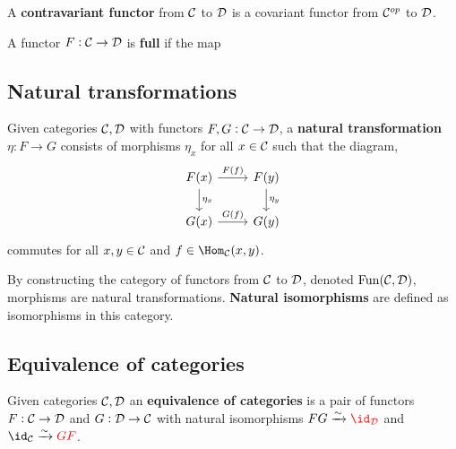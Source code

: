 \documentclass[../Year2.tex]{subfiles}
\begin{document}
\begin{definition}
    A \textbf{contravariant functor} from $\mathcal{C}$ to $\mathcal{D}$ is a covariant functor from $\mathcal{C}^{op}$ to $\mathcal{D}$.
\end{definition}

\begin{definition}[Full]
    A functor $F:\mathcal{C}\rightarrow\mathcal{D}$ is \textbf{full} if the map 
\end{definition}

\subsection{Natural transformations}

\begin{definition}
    Given categories $\mathcal{C},\mathcal{D}$ with functors $F,G:\mathcal{C}\rightarrow\mathcal{D}$, a \textbf{natural transformation} $\eta:F\rightarrow G$ consists of morphisms $\eta_x$ for all $x\in\mathcal{C}$ such that the diagram, \[
        \begin{tikzcd}
            F(x)\arrow[r, "F(f)"] \arrow[d, "\eta_x"] & F(y) \arrow[d, "\eta_y"]\\
            G(x)\arrow[r, "G(f)"]  & G(y)
        \end{tikzcd}
    \] commutes for all $x,y\in \mathcal{C}$ and $f\in\Hom_\CCC(x,y)$.
\end{definition}

\begin{remark}
    By constructing the category of functors from $\mathcal{C}$ to $\mathcal{D}$, denoted $\text{Fun}(\mathcal{C},\mathcal{D})$, morphisms are natural transformations. \textbf{Natural isomorphisms} are defined as isomorphisms in this category.
\end{remark}

\subsection{Equivalence of categories}

\begin{definition}[Equivalence]
    Given categories $\mathcal{C},\mathcal{D}$ an \textbf{equivalence of categories} is a pair of functors $F:\mathcal{C}\rightarrow\mathcal{D}$ and $G:\mathcal{D}\rightarrow\mathcal{C}$ with natural isomorphisms $FG\xrightarrow{\sim}\textcolor{red}{\id_\DDD}$ and $\id_\CCC\xrightarrow{\sim}\textcolor{red}{GF}$.
\end{definition}
\end{document}
